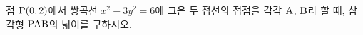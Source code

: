 점 $\mathrm{P}(0{,}\mkern3mu\mathopen{}2)$에서 쌍곡선 $x^2-3y^2=6$에 그은 두 접선의 접점을 각각 $\mathrm{A}$, $\mathrm{B}$라 할 때, 삼각형 $\mathrm{PAB}$의 넓이를 구하시오.
